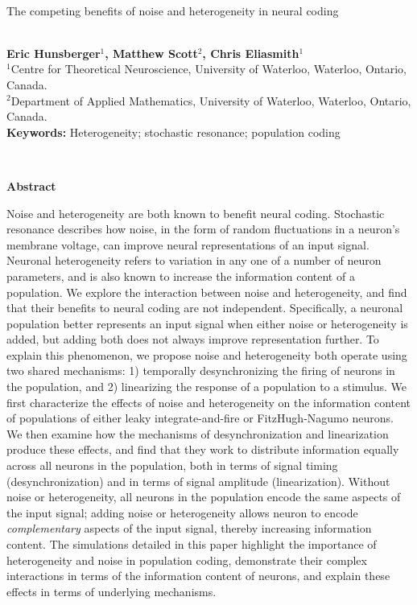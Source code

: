 \documentclass[12pt]{article}
\begin{document}
\hspace{13.9cm}

\ \vspace{20mm}\\

{\LARGE The competing benefits of noise and heterogeneity in neural coding}

\ \\
{\bf \large Eric Hunsberger$^{\displaystyle 1}$, Matthew Scott$^{\displaystyle 2}$, Chris Eliasmith$^{\displaystyle 1}$}\\
{$^{\displaystyle 1}$Centre for Theoretical Neuroscience, University of Waterloo, Waterloo, Ontario, Canada.}\\
{$^{\displaystyle 2}$Department of Applied Mathematics, University of Waterloo, Waterloo, Ontario, Canada.}\\
%

{\bf Keywords:} Heterogeneity; stochastic resonance; population coding

\thispagestyle{empty}
%
\ \vspace{-0mm}\\
%
\begin{center} {\bf Abstract} \end{center}

Noise and heterogeneity are both known to benefit neural coding. Stochastic resonance describes how noise, in the form of random fluctuations in a neuron's membrane voltage, can improve neural representations of an input signal. Neuronal heterogeneity refers to variation in any one of a number of neuron parameters, and is also known to increase the information content of a population. We explore the interaction between noise and heterogeneity, and find that their benefits to neural coding are not independent. Specifically, a neuronal population better represents an input signal when either noise or heterogeneity is added, but adding both does not always improve representation further. To explain this phenomenon, we propose noise and heterogeneity both operate using two shared mechanisms: 1) temporally desynchronizing the firing of neurons in the population, and 2) linearizing the response of a population to a stimulus. We first characterize the effects of noise and heterogeneity on the information content of populations of either leaky integrate-and-fire or FitzHugh-Nagumo neurons. We then examine how the mechanisms of desynchronization and linearization produce these effects, and find that they work to distribute information equally across all neurons in the population, both in terms of signal timing (desynchronization) and in terms of signal amplitude (linearization). Without noise or heterogeneity, all neurons in the population encode the same aspects of the input signal; adding noise or heterogeneity allows neuron to encode \emph{complementary} aspects of the input signal, thereby increasing information content. The simulations detailed in this paper highlight the importance of heterogeneity and noise in population coding, demonstrate their complex interactions in terms of the information content of neurons, and explain these effects in terms of underlying mechanisms.
\end{document}
